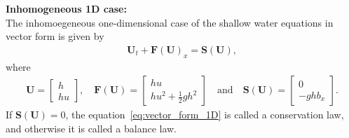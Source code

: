 \noindent \textbf{Inhomogeneous 1D case:}\\
The inhomoegeneous one-dimensional case of the shallow water equations in vector form is given by
\begin{align}\label{eq:vector_form_1D}
    \mathbf{U}_t + \mathbf{F(U)}_x = \mathbf{S(U)},
\end{align}
where
\begin{align}\label{eq:vector_form_1D_variables}
    \mathbf{U} = \begin{bmatrix}
        h \\
        hu
    \end{bmatrix},
    \quad
    \mathbf{F(U)} = \begin{bmatrix}
        hu \\
        hu^2 + \frac{1}{2}gh^2
    \end{bmatrix}
    \quad
    \text{and} \quad
    \mathbf{S(U)} = \begin{bmatrix}
        0 \\
        -gh b_x
    \end{bmatrix}.
\end{align}
If $\mathbf{S(U)} = 0$, the equation~\eqref{eq:vector_form_1D} is called a conservation law, and otherwise it is called a balance law.



